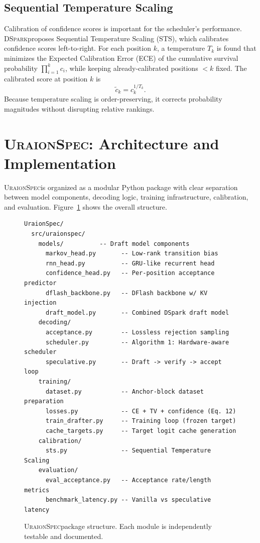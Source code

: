 \documentclass[11pt,a4paper]{article}
\newcommand{\UraionSpec}{\textsc{UraionSpec}}
\newcommand{\DSpark}{\textsc{DSpark}}
\begin{document}
\subsection{Sequential Temperature Scaling}
Calibration of confidence scores is important for the scheduler's
performance. \DSpark proposes Sequential Temperature Scaling (STS), which
calibrates confidence scores left-to-right. For each position $k$, a
temperature $T_k$ is found that minimizes the Expected Calibration Error
(ECE) of the cumulative survival probability $\prod_{i=1}^k c_i$, while
keeping already-calibrated positions $<k$ fixed. The calibrated score at
position $k$ is
\begin{equation}
  \tilde{c}_k = c_k^{1/T_k}.
\end{equation}
Because temperature scaling is order-preserving, it corrects probability
magnitudes without disrupting relative rankings.

\section{\UraionSpec: Architecture and Implementation}
\label{sec:method}

\UraionSpec is organized as a modular Python package with clear separation
between model components, decoding logic, training infrastructure,
calibration, and evaluation. Figure~\ref{fig:architecture} shows the
overall structure.

\begin{figure}[t]
  \centering
  \begin{minipage}{0.85\textwidth}
  \ttfamily\footnotesize
  \begin{verbatim}
UraionSpec/
  src/uraionspec/
    models/          -- Draft model components
      markov_head.py       -- Low-rank transition bias
      rnn_head.py          -- GRU-like recurrent head
      confidence_head.py   -- Per-position acceptance predictor
      dflash_backbone.py   -- DFlash backbone w/ KV injection
      draft_model.py       -- Combined DSpark draft model
    decoding/
      acceptance.py        -- Lossless rejection sampling
      scheduler.py         -- Algorithm 1: Hardware-aware scheduler
      speculative.py       -- Draft -> verify -> accept loop
    training/
      dataset.py           -- Anchor-block dataset preparation
      losses.py            -- CE + TV + confidence (Eq. 12)
      train_drafter.py     -- Training loop (frozen target)
      cache_targets.py     -- Target logit cache generation
    calibration/
      sts.py               -- Sequential Temperature Scaling
    evaluation/
      eval_acceptance.py   -- Acceptance rate/length metrics
      benchmark_latency.py -- Vanilla vs speculative latency
  \end{verbatim}
  \end{minipage}
  \caption{\UraionSpec package structure. Each module is independently
  testable and documented.}
  \label{fig:architecture}
\end{figure}
\end{document}
